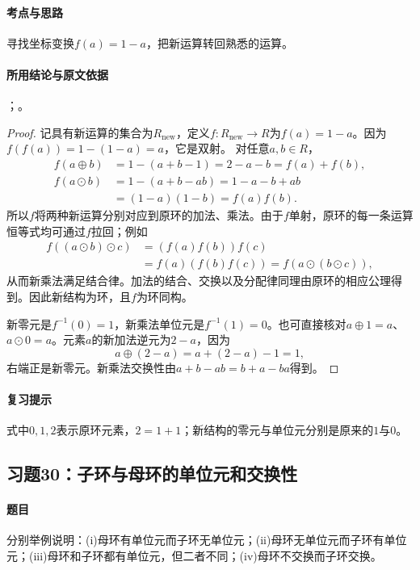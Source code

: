 \paragraph{考点与思路}
寻找坐标变换$f(a)=1-a$，把新运算转回熟悉的运算。

\paragraph{所用结论与原文依据}
；。


\begin{proof}
记具有新运算的集合为$R_{\mathrm{new}}$，定义$f:R_{\mathrm{new}}\to R$为$f(a)=1-a$。因为$f(f(a))=1-(1-a)=a$，它是双射。
对任意$a,b\in R$，
\begin{align*}
f(a\oplus b)&=1-(a+b-1)=2-a-b=f(a)+f(b),\\
f(a\odot b)&=1-(a+b-ab)=1-a-b+ab\\
&=(1-a)(1-b)=f(a)f(b).
\end{align*}
所以$f$将两种新运算分别对应到原环的加法、乘法。由于$f$单射，原环的每一条运算恒等式均可通过$f$拉回；例如
\begin{align*}
f((a\odot b)\odot c)&=(f(a)f(b))f(c)\\
&=f(a)(f(b)f(c))=f(a\odot(b\odot c)),
\end{align*}
从而新乘法满足结合律。加法的结合、交换以及分配律同理由原环的相应公理得到。因此新结构为环，且$f$为环同构。

新零元是$f^{-1}(0)=1$，新乘法单位元是$f^{-1}(1)=0$。也可直接核对$a\oplus1=a$、$a\odot0=a$。元素$a$的新加法逆元为$2-a$，因为
\[
a\oplus(2-a)=a+(2-a)-1=1,
\]
右端正是新零元。新乘法交换性由$a+b-ab=b+a-ba$得到。
\end{proof}

\paragraph{复习提示}
式中$0,1,2$表示原环元素，$2=1+1$；新结构的零元与单位元分别是原来的$1$与$0$。


\subsection{习题30：\texorpdfstring{子环与母环的单位元和交换性}{子环与母环的单位元和交换性}}
\label{ex:1:30}

\paragraph{题目}
分别举例说明：(i)母环有单位元而子环无单位元；(ii)母环无单位元而子环有单位元；(iii)母环和子环都有单位元，但二者不同；(iv)母环不交换而子环交换。

